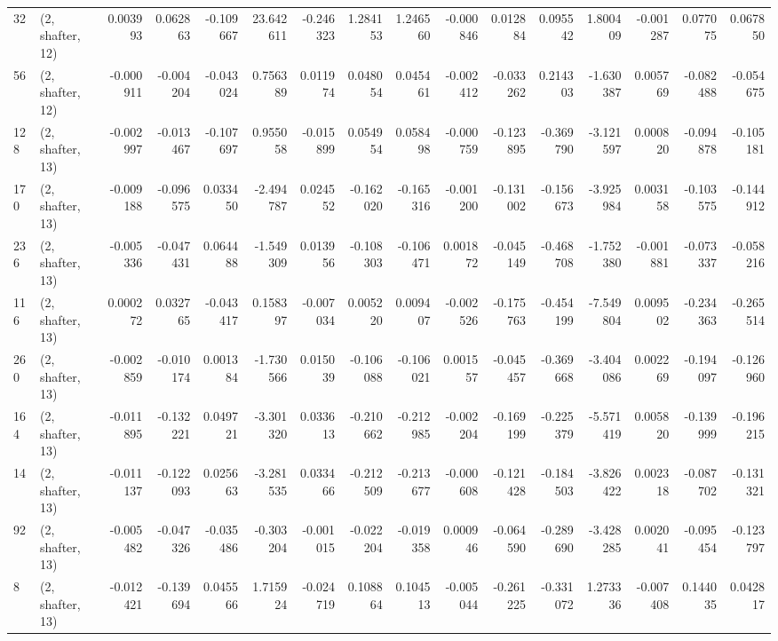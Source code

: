 \begin{tabular}{llrrrrrrrrrrrrrr}
32  &  (2, shafter, 12) &   0.003993 &  0.062863 & -0.109667 &   23.642611 & -0.246323 &   1.284153 &  1.246560 & -0.000846 &  0.012884 &  0.095542 &    1.800409 & -0.001287 &  0.077075 &  0.067850 \\
56  &  (2, shafter, 12) &  -0.000911 & -0.004204 & -0.043024 &    0.756389 &  0.011974 &   0.048054 &  0.045461 & -0.002412 & -0.033262 &  0.214303 &   -1.630387 &  0.005769 & -0.082488 & -0.054675 \\
128 &  (2, shafter, 13) &  -0.002997 & -0.013467 & -0.107697 &    0.955058 & -0.015899 &   0.054954 &  0.058498 & -0.000759 & -0.123895 & -0.369790 &   -3.121597 &  0.000820 & -0.094878 & -0.105181 \\
170 &  (2, shafter, 13) &  -0.009188 & -0.096575 &  0.033450 &   -2.494787 &  0.024552 &  -0.162020 & -0.165316 & -0.001200 & -0.131002 & -0.156673 &   -3.925984 &  0.003158 & -0.103575 & -0.144912 \\
236 &  (2, shafter, 13) &  -0.005336 & -0.047431 &  0.064488 &   -1.549309 &  0.013956 &  -0.108303 & -0.106471 &  0.001872 & -0.045149 & -0.468708 &   -1.752380 & -0.001881 & -0.073337 & -0.058216 \\
116 &  (2, shafter, 13) &   0.000272 &  0.032765 & -0.043417 &    0.158397 & -0.007034 &   0.005220 &  0.009407 & -0.002526 & -0.175763 & -0.454199 &   -7.549804 &  0.009502 & -0.234363 & -0.265514 \\
260 &  (2, shafter, 13) &  -0.002859 & -0.010174 &  0.001384 &   -1.730566 &  0.015039 &  -0.106088 & -0.106021 &  0.001557 & -0.045457 & -0.369668 &   -3.404086 &  0.002269 & -0.194097 & -0.126960 \\
164 &  (2, shafter, 13) &  -0.011895 & -0.132221 &  0.049721 &   -3.301320 &  0.033613 &  -0.210662 & -0.212985 & -0.002204 & -0.169199 & -0.225379 &   -5.571419 &  0.005820 & -0.139999 & -0.196215 \\
14  &  (2, shafter, 13) &  -0.011137 & -0.122093 &  0.025663 &   -3.281535 &  0.033466 &  -0.212509 & -0.213677 & -0.000608 & -0.121428 & -0.184503 &   -3.826422 &  0.002318 & -0.087702 & -0.131321 \\
92  &  (2, shafter, 13) &  -0.005482 & -0.047326 & -0.035486 &   -0.303204 & -0.001015 &  -0.022204 & -0.019358 &  0.000946 & -0.064590 & -0.289690 &   -3.428285 &  0.002041 & -0.095454 & -0.123797 \\
8   &  (2, shafter, 13) &  -0.012421 & -0.139694 &  0.045566 &    1.715924 & -0.024719 &   0.108864 &  0.104513 & -0.005044 & -0.261225 & -0.331072 &    1.273336 & -0.007408 &  0.144035 &  0.042817 \\

\end{tabular}

